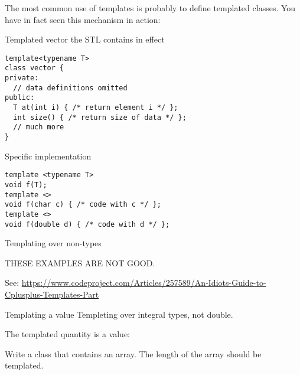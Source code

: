 The most common use of templates is probably to define templated
classes.
You have in fact seen this mechanism in action:
\begin{block}{Templated vector}
  \label{sl:template-vector}
  the \ac{STL} contains
  in effect
\begin{verbatim}
template<typename T>
class vector {
private:
  // data definitions omitted
public:
  T at(int i) { /* return element i */ };
  int size() { /* return size of data */ };
  // much more
}
\end{verbatim}
\end{block}

 {Specific implementation}

\begin{verbatim}
template <typename T>
void f(T);
template <> 
void f(char c) { /* code with c */ };
template <>
void f(double d) { /* code with d */ };
\end{verbatim}

 {Templating over non-types}

THESE EXAMPLES ARE NOT GOOD.

See:
\url{https://www.codeproject.com/Articles/257589/An-Idiots-Guide-to-Cplusplus-Templates-Part}

\begin{block}{Templating a value}
  Templeting over integral types, not double.

  The templated quantity is a value:
\end{block}

\begin{exercise}
  Write a class that contains an array. The length of the array should
  be templated.
\end{exercise}
